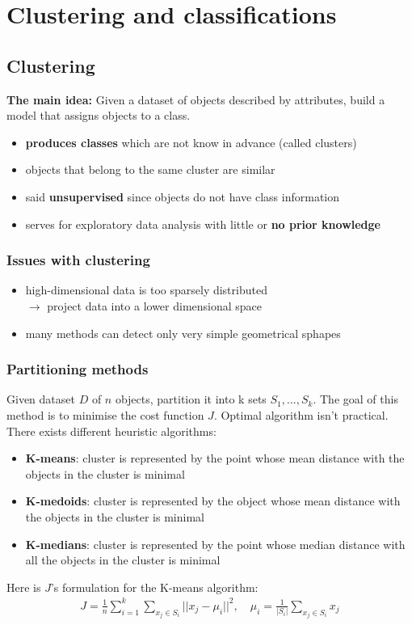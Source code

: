 \section{Clustering and classifications}

\subsection{Clustering}
\textbf{The main idea:} Given a dataset of objects described by attributes, build a model that assigns objects to a class. 

\begin{itemize}
	\item \textbf{produces classes} which are not know in advance (called clusters)
	\item objects that belong to the same cluster are similar
	\item said \textbf{unsupervised} since objects do not have class information 
	\item serves for exploratory data analysis with little or \textbf{no prior knowledge}
\end{itemize}

\subsubsection*{Issues with clustering}

\begin{itemize}
	\item high-dimensional data is too sparsely distributed 
	\\ $\rightarrow$ project data into a lower dimensional space
	\item many methods can detect only very simple geometrical sphapes
\end{itemize}

\subsubsection*{Partitioning methods}
Given dataset $D$ of $n$ objects, partition it into k sets $S_1, ..., S_k$. The goal of this method is to minimise the cost function $J$. 
Optimal algorithm isn't practical. There exists different heuristic algorithms:

\begin{itemize}
	\item \textbf{K-means}: cluster is represented by the point whose mean distance with the objects in the cluster is minimal

	\item \textbf{K-medoids}: cluster is represented by the object whose mean distance with the objects in the cluster is minimal

	\item \textbf{K-medians}: cluster is represented by the point whose median distance with all the objects in the cluster is minimal
\end{itemize}
Here is $J$'s formulation for the K-means algorithm:
\begin{align*}
	J = \frac{1}{n} \sum_{i = 1}^{k} \sum_{x_j \in S_i} || x_j - \mu_i ||^2 , \quad \mu_i = \frac{1}{|S_i|} \sum_{x_j \in S_i} x_j
\end{align*}

